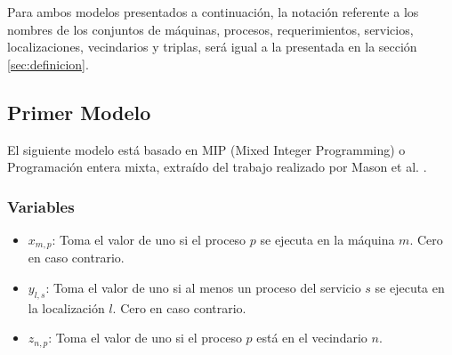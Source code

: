 Para ambos modelos presentados a continuación, la notación referente a los nombres de los conjuntos de máquinas, procesos, requerimientos, servicios, localizaciones, vecindarios y triplas, será igual a la presentada en la sección \ref{sec:definicion}.
\subsection{Primer Modelo}
El siguiente modelo está basado en  MIP (Mixed Integer Programming) o Programación entera mixta, extraído del trabajo realizado por Mason et al. \cite{masson2013iterated}.

\subsubsection{Variables}
\begin{itemize}
	\item $x_{m,p}$: Toma el valor de uno si el proceso $p$ se ejecuta en la máquina $m$. Cero en caso contrario.
	\item $y_{l,s}$: Toma el valor de uno si al menos un proceso del servicio $s$ se ejecuta en la localización $l$. Cero en caso contrario.
	\item $z_{n,p}$: Toma el valor de uno si el proceso $p$ está en el vecindario $n$.
\end{itemize}

